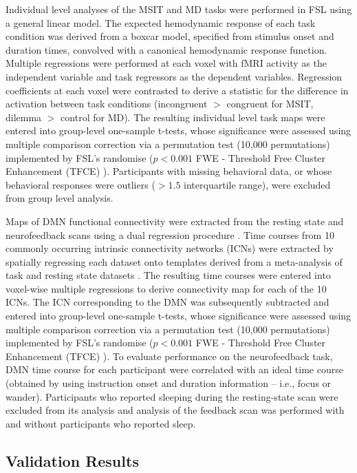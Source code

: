 Individual level analyses of the MSIT and MD tasks were performed in FSL using a general linear model. The expected hemodynamic response of each task condition was derived from a boxcar model, specified from stimulus onset and duration times, convolved with a canonical hemodynamic response function. Multiple regressions were performed at each voxel with fMRI activity as the independent variable and task regressors as the dependent variables. Regression coefficients at each voxel were contrasted to derive a statistic for the difference in activation between task conditions (incongruent $>$ congruent for MSIT, dilemma $>$ control for MD). The resulting individual level task maps were entered into group-level one-sample t-tests, whose significance were assessed using multiple comparison correction via a permutation test (10,000 permutations) implemented by FSL’s randomise ($p<0.001$ FWE - Threshold Free Cluster Enhancement (TFCE) \cite{Salimi-Khorshidi2011}). Participants with missing behavioral data, or whose behavioral responses were outliers ($>1.5$ interquartile range), were excluded from group level analysis.

Maps of DMN functional connectivity were extracted from the resting state and neurofeedback scans using a dual regression procedure \cite{Filippini2009}. Time courses from 10 commonly occurring intrinsic connectivity networks (ICNs) were extracted by spatially regressing each dataset onto templates derived from a meta-analysis of task and resting state datasets \cite{Smith2009}. The resulting time courses were entered into voxel-wise multiple regressions to derive connectivity map for each of the 10 ICNs. The ICN corresponding to the DMN was subsequently subtracted and entered into group-level one-sample t-tests, whose significance were assessed using multiple comparison correction via a permutation test (10,000 permutations) implemented by FSL’s randomise ($p<0.001$ FWE - Threshold Free Cluster Enhancement (TFCE) \cite{Salimi-Khorshidi2011}). To evaluate performance on the neurofeedback task, DMN time course for each participant were correlated with an ideal time course (obtained by using instruction onset and duration information – i.e., focus or wander). Participants who reported sleeping during the resting-state scan were excluded from its analysis and analysis of the feedback scan was performed with and without participants who reported sleep.

\subsection{Validation Results}

